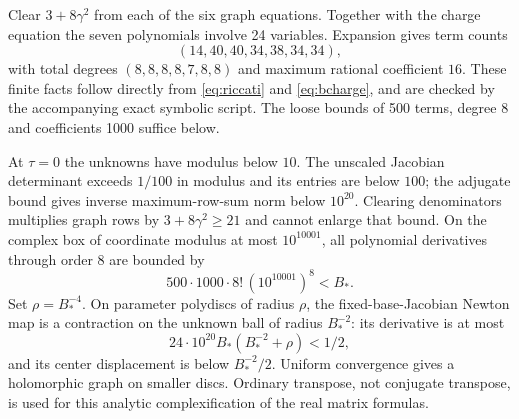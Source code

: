 \documentclass[11pt]{article}
\theoremstyle{remark}\newtheorem{remark}[theorem]{Remark}
\numberwithin{equation}{section}
\begin{document}
Clear $3+8\gamma^2$ from each of the six graph equations. Together with the charge equation the seven polynomials involve 24 variables. Expansion gives term counts
\[
 (14,40,40,34,38,34,34),
\]
with total degrees $(8,8,8,8,7,8,8)$ and maximum rational coefficient $16$. These finite facts follow directly from \eqref{eq:riccati} and \eqref{eq:bcharge}, and are checked by the accompanying exact symbolic script. The loose bounds of 500 terms, degree 8 and coefficients 1000 suffice below.

At $\tau=0$ the unknowns have modulus below $10$. The unscaled Jacobian determinant exceeds $1/100$ in modulus and its entries are below $100$; the adjugate bound gives inverse maximum-row-sum norm below $10^{20}$. Clearing denominators multiplies graph rows by $3+8\gamma^2\geq21$ and cannot enlarge that bound. On the complex box of coordinate modulus at most $10^{10001}$, all polynomial derivatives through order 8 are bounded by
\[
 500\cdot1000\cdot8!\,(10^{10001})^8<B_*.
\]
Set $\rho=B_*^{-4}$. On parameter polydiscs of radius $\rho$, the fixed-base-Jacobian Newton map is a contraction on the unknown ball of radius $B_*^{-2}$: its derivative is at most
\[
 24\cdot10^{20}B_*(B_*^{-2}+\rho)<1/2,
\]
and its center displacement is below $B_*^{-2}/2$. Uniform convergence gives a holomorphic graph on smaller discs. Ordinary transpose, not conjugate transpose, is used for this analytic complexification of the real matrix formulas.
\end{document}
